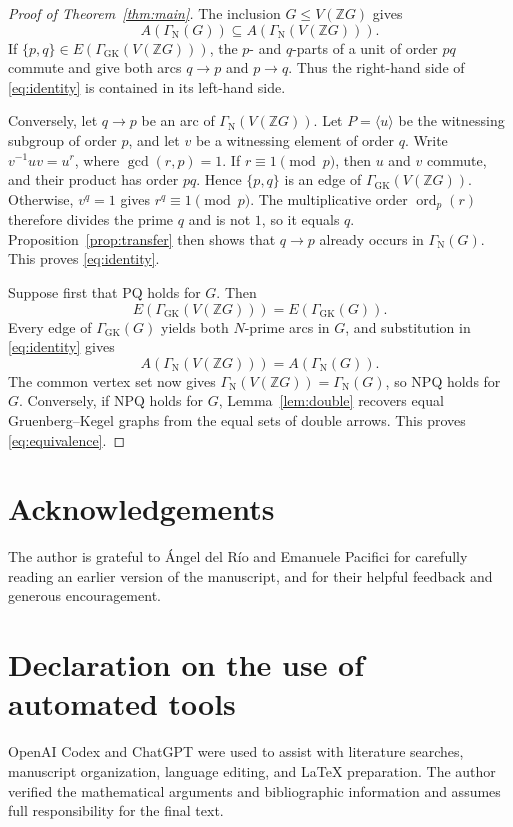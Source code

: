 \documentclass[11pt,a4paper]{article}
\theoremstyle{remark}
\newcommand{\VZG}{V(\mathbb ZG)}
\newcommand{\GN}{\Gamma_{\mathrm N}}
\newcommand{\GGK}{\Gamma_{\mathrm{GK}}}
\begin{document}
\begin{proof}[Proof of Theorem~\ref{thm:main}]
The inclusion $G\leq\VZG$ gives
\[
 A(\GN(G))\subseteq A(\GN(\VZG)).
\]
If $\{p,q\}\in E(\GGK(\VZG))$, the $p$- and $q$-parts of a unit of order
$pq$ commute and give both arcs $q\to p$ and $p\to q$. Thus the
right-hand side of \eqref{eq:identity} is contained in its left-hand side.

Conversely, let $q\to p$ be an arc of $\GN(\VZG)$. Let
$P=\langle u\rangle$ be the witnessing subgroup of order $p$, and let $v$
be a witnessing element of order $q$. Write $v^{-1}uv=u^r$, where
\mbox{$\gcd(r,p)=1$}. If $r\equiv1\pmod p$, then $u$ and $v$ commute, and their
product has order $pq$. Hence $\{p,q\}$ is an edge of $\GGK(\VZG)$.
Otherwise,
$v^q=1$ gives $r^q\equiv1\pmod p$. The multiplicative order
$\operatorname{ord}_p(r)$ therefore divides the prime $q$ and is not $1$,
so it equals $q$. Proposition~\ref{prop:transfer} then shows that $q\to p$
already occurs in $\GN(G)$. This proves \eqref{eq:identity}.

Suppose first that PQ holds for $G$. Then
\[
 E(\GGK(\VZG))=E(\GGK(G)).
\]
Every edge of $\GGK(G)$ yields both $N$-prime arcs in $G$, and substitution
in \eqref{eq:identity} gives
\[
 A(\GN(\VZG))=A(\GN(G)).
\]
The common vertex set now gives $\GN(\VZG)=\GN(G)$, so NPQ holds for $G$.
Conversely, if NPQ holds for $G$, Lemma~\ref{lem:double} recovers equal
Gruenberg--Kegel graphs from the equal sets of double arrows. This proves
\eqref{eq:equivalence}.
\end{proof}

\section*{Acknowledgements}

The author is grateful to \'Angel del R\'io and Emanuele Pacifici for
carefully reading an earlier version of the manuscript, and for their
helpful feedback and generous encouragement.

\section*{Declaration on the use of automated tools}

OpenAI Codex and ChatGPT were used to assist with literature searches,
manuscript organization, language editing, and \LaTeX{} preparation.
The author verified the mathematical arguments and bibliographic
information and assumes full responsibility for the final text.
\end{document}
